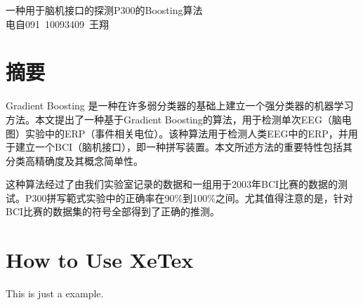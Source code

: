 \documentclass[10pt,a4paper]{ecustthss}
\title{\thetitle}
\def\thetitle{一种用于脑机接口的探测P300的Boosting算法}
\def\class{电自091}
\def\studentnumber{10093409}
\def\myname{王翔}
\begin{document}
  \pagestyle{translation}
  \begin{center}
    \huge{\thetitle} \\
    \huge{\class \, \studentnumber \, \myname}
  \end{center}
  \section*{摘要}

\cabstract Gradient Boosting 是一种在许多弱分类器的基础上建立一个强分类器的机器学习方法。本文提出了一种基于Gradient Boosting的算法，用于检测单次EEG（脑电图）实验中的ERP（事件相关电位）。该种算法用于检测人类EEG中的ERP，并用于建立一个BCI（脑机接口），即一种拼写装置。本文所述方法的重要特性包括其分类高精确度及其概念简单性。

这种算法经过了由我们实验室记录的数据和一组用于2003年BCI比赛的数据的测试。P300拼写範式实验中的正确率在90\%到100\%之间。尤其值得注意的是，针对BCI比赛的数据集的符号全部得到了正确的推测。
  
  \section{How to Use XeTex}
  This is just a example.
\end{document}
